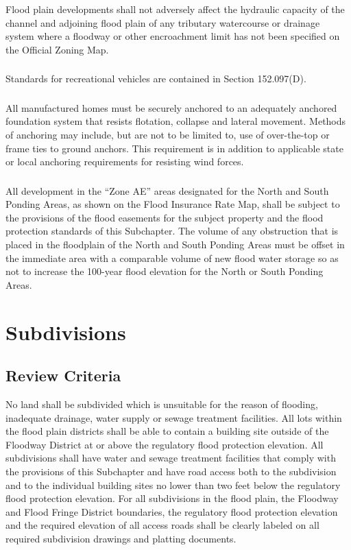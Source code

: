 \subsubsection{}
Flood plain developments shall not adversely affect the hydraulic capacity of the channel and adjoining flood plain of any tributary watercourse or drainage system where a floodway or other encroachment limit has not been specified on the Official Zoning Map.
\subsubsection{}
Standards for recreational vehicles are contained in Section 152.097(D).
\subsubsection{}
All manufactured homes must be securely anchored to an adequately anchored foundation system that resists flotation, collapse and lateral movement. Methods of anchoring may include, but are not to be limited to, use of over-the-top or frame ties to ground anchors. This requirement is in addition to applicable state or local anchoring requirements for resisting wind forces.
\subsubsection{}
All development in the “Zone AE” areas designated for the North and South Ponding Areas, as shown on the Flood Insurance Rate Map, shall be subject to the provisions of the flood easements for the subject property and the flood protection standards of this Subchapter. The volume of any obstruction that is placed in the floodplain of the North and South Ponding Areas must be offset in the immediate area with a comparable volume of new flood water storage so as not to increase the 100-year flood elevation for the North or South Ponding Areas.
\section{Subdivisions}
\subsection{Review Criteria}
No land shall be subdivided which is unsuitable for the reason of flooding, inadequate drainage, water supply or sewage treatment facilities. All lots within the flood plain districts shall be able to contain a building site outside of the Floodway District at or above the regulatory flood protection elevation. All subdivisions shall have water and sewage treatment facilities that comply with the provisions of this Subchapter and have road access both to the subdivision and to the individual building sites no lower than two feet below the regulatory flood protection elevation. For all subdivisions in the flood plain, the Floodway and Flood Fringe District boundaries, the regulatory flood protection elevation and the required elevation of all access roads shall be clearly labeled on all required subdivision drawings and platting documents.
